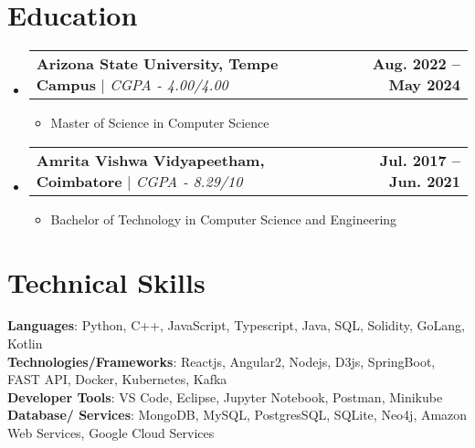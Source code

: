 \documentclass[letterpaper,11pt]{article}
\makeatletter
\newcommand{\resumeItem}[1]{
  \item\small{
    {#1 \vspace{-2pt}}
  }
}
\newcommand{\resumeEducationHeading}[2]{
    \item\vspace{-4pt}
    \begin{tabular*}{1.001\textwidth}{l@{\extracolsep{\fill}}r}
      \small#1 & \textbf{\small #2}\\
    \end{tabular*}\vspace{-7pt}
}
\newcommand{\resumeSubHeadingListStart}{\begin{itemize}[leftmargin=0.0in, label={}]}
\newcommand{\resumeSubHeadingListEnd}{\end{itemize}}
\newcommand{\resumeItemListStart}{\begin{itemize}}
\newcommand{\resumeItemListEndESpace}{\end{itemize}\vspace{-8pt}}
\newcommand{\resumeItemListEndLessSpace}{\end{itemize}\vspace{-20pt}}
\makeatother
\begin{document}
\section{Education}
  \resumeSubHeadingListStart
    \resumeEducationHeading
          {\textbf{Arizona State University, Tempe Campus} $|$ \emph{CGPA - 4.00/4.00}}{Aug. 2022 -- May 2024}
          \resumeItemListStart
            \resumeItem{Master of Science in Computer Science}
          \resumeItemListEndLessSpace
    \resumeEducationHeading
          {\textbf{Amrita Vishwa Vidyapeetham, Coimbatore} $|$ \emph{CGPA - 8.29/10}}{Jul. 2017 -- Jun. 2021}
          \resumeItemListStart
            \resumeItem{Bachelor of Technology in Computer Science and Engineering}
          \resumeItemListEndESpace
  \resumeSubHeadingListEnd


\section{Technical Skills}
 \begin{itemize}[leftmargin=0.15in, label={}]
    \small{\item{
     \textbf{Languages}{: Python, C++, JavaScript, Typescript, Java, SQL, Solidity, GoLang, Kotlin} \\
     \textbf{Technologies/Frameworks}{: Reactjs, Angular2, Nodejs, D3js, SpringBoot, FAST API, Docker, Kubernetes, Kafka} \\
     \textbf{Developer Tools}{: VS Code, Eclipse, Jupyter Notebook, Postman, Minikube} \\
     \textbf{Database/ Services}{: MongoDB, MySQL, PostgresSQL, SQLite, Neo4j, Amazon Web Services, Google Cloud Services} \\
    }}
 \end{itemize}
 \vspace{-15pt}
\end{document}

